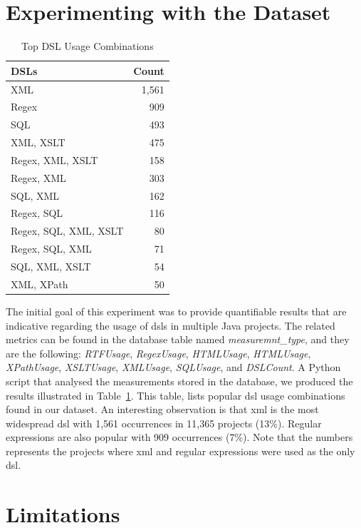 \documentclass{sig-alternate}
\begin{document}
\section{Experimenting with the Dataset}
\label{sec:dsl}

\begin{table}
\centering
\caption{Top DSL Usage Combinations}
\label{tbl:dsl-top-usage}
\begin{tabular}{l r}
 \hline
\textbf{DSLs} & \textbf{Count}\\
\hline
XML & 1,561\\
Regex & 909\\
SQL & 493\\
XML, XSLT & 475\\
Regex, XML, XSLT & 158\\
Regex, XML & 303\\
SQL, XML & 162\\
Regex, SQL & 116\\
Regex, SQL, XML, XSLT & 80\\
Regex, SQL, XML & 71\\
SQL, XML, XSLT & 54\\
XML, XPath & 50\\
\hline
\end{tabular}
\end{table}

The initial goal of this experiment was to provide quantifiable results that are indicative regarding the usage of {\sc dsl}s in multiple Java projects. The related metrics can be found in the database table named \textit{measuremnt\_type}, and they are the following: \textit{RTFUsage}, \textit{RegexUsage}, \textit{HTMLUsage}, \textit{HTMLUsage}, \textit{XPathUsage}, \textit{XSLTUsage}, \textit{XMLUsage}, \textit{SQLUsage}, and \textit{DSLCount}. A Python script that analysed the measurements stored in the database, we produced the results illustrated in Table~\ref{tbl:dsl-top-usage}. This table, lists popular {\sc dsl} usage combinations found in our dataset. An interesting observation is that {\sc xml} is the most widespread {\sc dsl} with 1,561 occurrences in 11,365 projects (13\%). Regular expressions are also popular with 909 occurrences (7\%). Note that the numbers represents the projects where {\sc xml} and regular expressions were used as the only {\sc dsl}.

\section{Limitations}
\label{sec:limit}
\end{document}
